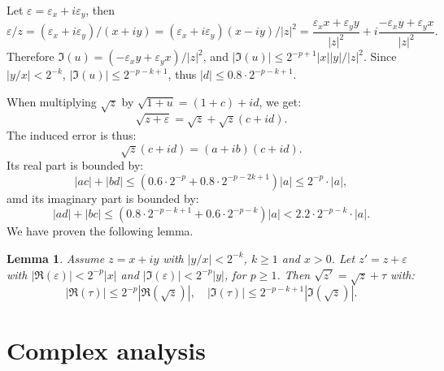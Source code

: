\documentclass [11pt]{article}
\renewcommand {\epsilon}{\varepsilon}
\newtheorem{lemma}[theorem]{Lemma}
\begin{document}
Let $\epsilon = \epsilon_x + i \epsilon_y$, then
\[ \epsilon/z = (\epsilon_x + i \epsilon_y)/(x + iy) =
  (\epsilon_x + i \epsilon_y)(x-iy)/|z|^2
  = \frac{\epsilon_x x + \epsilon_y y}{|z|^2}
  + i \frac{-\epsilon_x y + \epsilon_y x}{|z|^2}. \]
Therefore $\Im(u) = (-\epsilon_x y + \epsilon_y x)/|z|^2$,
and $|\Im(u)| \le 2^{-p+1} |x| |y|/|z|^2$.
Since $|y/x| < 2^{-k}$, $|\Im(u)| \le 2^{-p-k+1}$,
thus $|d| \le 0.8 \cdot 2^{-p-k+1}$.

When multiplying $\sqrt{z}$ by $\sqrt{1+u} = (1+c)+id$, we get:
\[ \sqrt{z + \epsilon} = \sqrt{z} + \sqrt{z}  (c + i d). \]
The induced error is thus:
\[ \sqrt{z}  (c + i d) = (a + ib) (c + i d). \]
Its real part is bounded by:
\[ |ac| + |bd| \le (0.6 \cdot 2^{-p} + 0.8 \cdot 2^{-p-2k+1}) |a|
  \le 2^{-p} \cdot |a|, \]
amd its imaginary part is bounded by:
\[ |ad| + |bc| \le (0.8 \cdot 2^{-p-k+1} + 0.6 \cdot 2^{-p-k}) |a|
  < 2.2 \cdot 2^{-p-k} \cdot |a|. \]
We have proven the following lemma.
\begin{lemma} \label{lem:sqrt}
  Assume $z = x + iy$ with $|y/x| < 2^{-k}$, $k \ge 1$ and $x > 0$.
  Let $z' = z + \epsilon$ with $|\Re(\epsilon)| < 2^{-p} |x|$
  and $|\Im(\epsilon)| < 2^{-p} |y|$, for $p \ge 1$.
  Then $\sqrt{z'} = \sqrt{z} + \tau$ with:
  \[ |\Re(\tau)| \le 2^{-p} |\Re(\sqrt{z})|, \quad
     |\Im(\tau)| \le 2^{-p-k+1} |\Im(\sqrt{z})|. \]
\end{lemma}

\section {Complex analysis}
\end{document}
